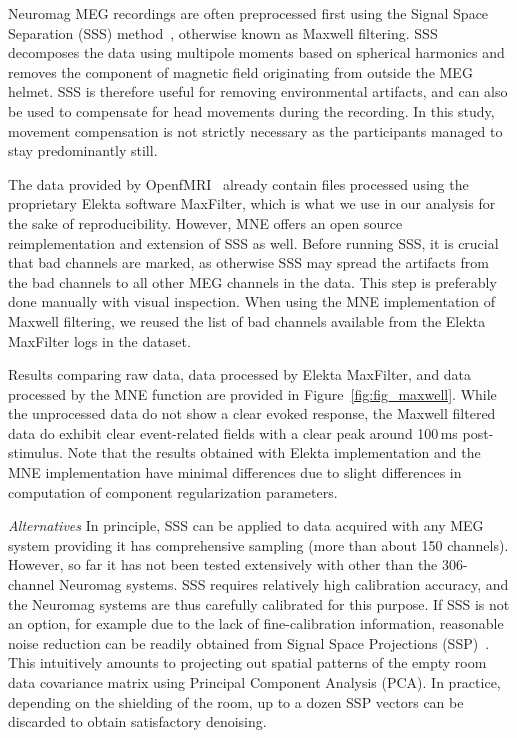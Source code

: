 Neuromag MEG recordings are often preprocessed first using the Signal Space Separation (SSS) method~\citep{taulu:06}, otherwise known as Maxwell filtering. SSS decomposes the data using multipole moments based on spherical harmonics and removes the component of magnetic field originating from outside the MEG helmet. SSS is therefore useful for removing environmental artifacts, and can also be used to compensate for head movements during the recording. In this study, movement compensation is not strictly necessary as the participants managed to stay predominantly still.

The data provided by OpenfMRI~\citep{poldrack2017openfmri} already contain files processed using the proprietary Elekta software MaxFilter, which is what we use in our analysis for the sake of reproducibility. However, MNE offers an open source reimplementation and extension of SSS as well. Before running SSS, it is crucial that bad channels are marked, as otherwise SSS may spread the artifacts from the bad channels to all other MEG channels in the data. This step is preferably done manually with visual inspection. When using the MNE implementation of Maxwell filtering, we reused the list of bad channels available from the Elekta MaxFilter logs in the dataset.

Results comparing raw data, data processed by Elekta MaxFilter, and data processed by the MNE  function are provided in Figure~\ref{fig:fig_maxwell}. While the unprocessed data do not show a clear evoked response, the Maxwell filtered data do exhibit clear event-related fields with a clear peak around 100\,ms post-stimulus. Note that the results obtained with Elekta implementation and the MNE implementation have minimal differences due to slight differences in computation of component regularization parameters.

\emph{Alternatives} In principle, SSS can be applied to data acquired with any MEG system providing it has comprehensive sampling (more than  about 150 channels). However, so far it has not been tested extensively with other than the 306-channel Neuromag systems. SSS requires relatively high calibration accuracy, and the Neuromag systems are thus carefully calibrated for this purpose. If SSS is not an option, for example due to the lack of fine-calibration information, reasonable noise reduction can be readily obtained from Signal Space Projections (SSP)~\citep{ssp}. This intuitively amounts to projecting out spatial patterns of the empty room data covariance matrix using Principal Component Analysis (PCA). In practice, depending on the shielding of the room, up to a dozen SSP vectors can be discarded to obtain satisfactory denoising.

